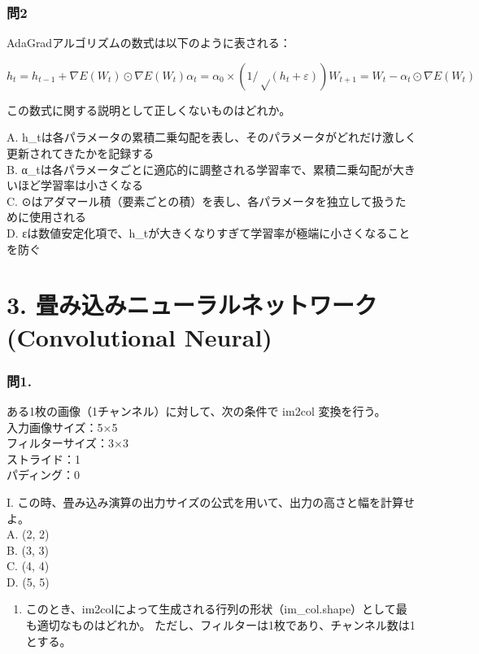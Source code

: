 \documentclass[
  letterpaper,
  DIV=11,
  numbers=noendperiod]{scrreprt}
\providecommand{\tightlist}{%
  \setlength{\itemsep}{0pt}\setlength{\parskip}{0pt}}
\begin{document}
\subsection{問2}\label{ux554f2-1}

AdaGradアルゴリズムの数式は以下のように表される：

\[
h_t = h_{t-1} + ∇E(W_t) ⊙ ∇E(W_t)
α_t = α_0 × (1/√(h_t + ε))
W_{t+1} = W_t - α_t ⊙ ∇E(W_t)
\]

この数式に関する説明として正しくないものはどれか。

A.
h\_tは各パラメータの累積二乗勾配を表し、そのパラメータがどれだけ激しく更新されてきたかを記録する\\
B.
α\_tは各パラメータごとに適応的に調整される学習率で、累積二乗勾配が大きいほど学習率は小さくなる\\
C.
⊙はアダマール積（要素ごとの積）を表し、各パラメータを独立して扱うために使用される\\
D.
εは数値安定化項で、h\_tが大きくなりすぎて学習率が極端に小さくなることを防ぐ

\chapter{3. 畳み込みニューラルネットワーク (Convolutional
Neural)}\label{ux7573ux307fux8fbcux307fux30cbux30e5ux30fcux30e9ux30ebux30cdux30c3ux30c8ux30efux30fcux30af-convolutional-neural}

\subsection{問1.}\label{ux554f1.}

ある1枚の画像（1チャンネル）に対して、次の条件で im2col 変換を行う。\\
入力画像サイズ：5×5\\
フィルターサイズ：3×3\\
ストライド：1\\
パディング：0

I.
この時、畳み込み演算の出力サイズの公式を用いて、出力の高さと幅を計算せよ。\\
A. (2, 2)\\
B. (3, 3)\\
C. (4, 4)\\
D. (5, 5)

\begin{enumerate}
\def\labelenumi{\Roman{enumi}.}
\setcounter{enumi}{1}
\tightlist
\item
  このとき、im2colによって生成される行列の形状（im\_col.shape）として最も適切なものはどれか。
  ただし、フィルターは1枚であり、チャンネル数は1とする。
\end{enumerate}
\end{document}
